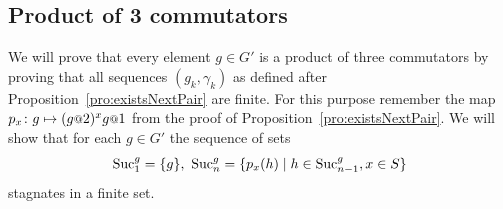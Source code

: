 \documentclass[a4paper,11pt]{amsart}
\begin{document}
 
%  
%  
\subsection{Product of 3 commutators}
We will prove that every element $g\in G'$ is a product of three commutators by proving that all
sequences $(g_k,\gamma_k)$ as defined after Proposition~\ref{pro:existsNextPair} are finite.
For this purpose remember the map $p_x\colon g \mapsto (g\at{2})^x g\at{1}$ from the proof of Proposition~\ref{pro:existsNextPair}.
We will show that for each $g\in G'$ the sequence of sets 
\[\textup{Suc}_1^g=\{g\},\ \textup{Suc}_n^g = \{p_x(h) \mid h\in \textup{Suc}_{n-1}^g, x\in S\} \]
stagnates in a finite set. 
\end{document}
